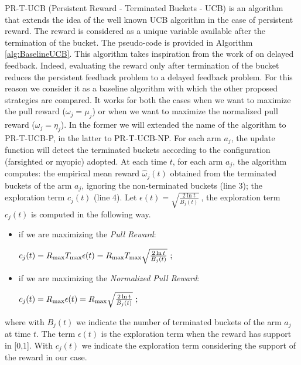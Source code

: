 PR-T-UCB (Persistent Reward - Terminated Buckets - UCB) is an algorithm that extends the idea of the well known UCB algorithm in the case of persistent reward. The reward is considered as a unique variable available after the termination of the bucket. The pseudo-code is provided in Algorithm \ref{alg:BaselineUCB}.
This algorithm takes inspiration from the work of \cite{joulani2013} on delayed feedback. Indeed, evaluating the reward only after termination of the bucket reduces the persistent feedback problem to a delayed feedback problem. For this reason we consider it as a baseline algorithm with which the other proposed strategies are compared. It works for both the cases when we want to maximize the pull reward ($\omega_j = \mu_j$) or when we want to maximize the normalized pull reward ($\omega_j = \eta_j$). In the former we will extended the name of the algorithm to PR-T-UCB-P, in the latter to PR-T-UCB-NP.
For each arm $a_j$, the update function will detect the terminated buckets according to the configuration (farsighted or myopic) adopted. At each time $t$, for each arm $a_j$, the algorithm computes: the empirical mean reward $\hat{\omega}_j(t)$ obtained from the terminated buckets of the arm $a_j$, ignoring the non-terminated buckets (line 3); the exploration term $c_j(t)$ (line 4). Let $\epsilon(t) = \sqrt{\frac{2\ln t}{B_j(t)}} \ $, the exploration term  $c_j(t)$ is computed in the following way.
\begin{itemize}
	\item if we are maximizing the \emph{Pull Reward}:\\
	\begin{centering}
		$c_j(t) = R_{\textnormal{max}}  T_{\textnormal{max}} \epsilon(t) = R_{\textnormal{max}}  T_{\textnormal{max}} \sqrt{\frac{2\ln t}{B_j(t)}} \ ;$	
	\end{centering}
		 
	\item if we are maximizing the \emph{Normalized Pull Reward}:\\
	\begin{centering}
			$c_j(t) =R_{\textnormal{max}}  \epsilon(t) = R_{\textnormal{max}}  \sqrt{\frac{2\ln t}{B_j(t)}} \ ;$
	\end{centering}	
\end{itemize}


 where with ${B_j(t)}$ we indicate the number of terminated buckets of the arm $a_j$ at time $t$. The term $\epsilon(t)$ is the exploration term when the reward has support in [0,1]. With $c_j(t)$ we indicate the exploration term considering the support of the reward in our case.
 
